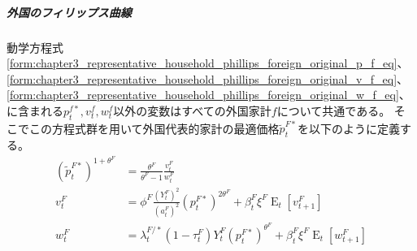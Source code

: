 \subparagraph{外国のフィリップス曲線}
\label{sec:chapter3_representative_household_phillips_foreign_representative_phillips}
動学方程式
\eqref{form:chapter3_representative_household_phillips_foreign_original_p_f_eq}、
\eqref{form:chapter3_representative_household_phillips_foreign_original_v_f_eq}、
\eqref{form:chapter3_representative_household_phillips_foreign_original_w_f_eq}、
に含まれる\(p_t^{f*}, v_t^f, w_t^f\)以外の変数はすべての外国家計\(f\)について共通である。
そこでこの方程式群を用いて外国代表的家計の最適価格\(\widetilde{p}_t^{F*}\)を以下のように定義する。
\begin{align}
    \label{form:chapter3_representative_household_phillips_foreign_representative_p_F_tilde_def}
        (\widetilde{p}_t^{F*})^{1+\theta^F}&=\frac{\theta^F}{\theta^F-1}\frac{v_t^F}{w_t^F} \\
    \label{form:chapter3_representative_household_phillips_foreign_representative_v_F_eq}
        v_t^F&=\phi^F\frac{(Y_t^F)^2}{(a_t^F)^2}(p_t^{F*})^{2\theta^F}+\beta_t^F\xi^F\operatorname{E}_t[v_{t+1}^F] \\
    \label{form:chapter3_representative_household_phillips_foreign_representative_w_F_eq}
        w_t^F&=\lambda_t^{F/*}(1-\tau_t^F)Y_t^F(p_t^{F*})^{\theta^F}+\beta_t^F\xi^F\operatorname{E}_t[w_{t+1}^F]
\end{align}


